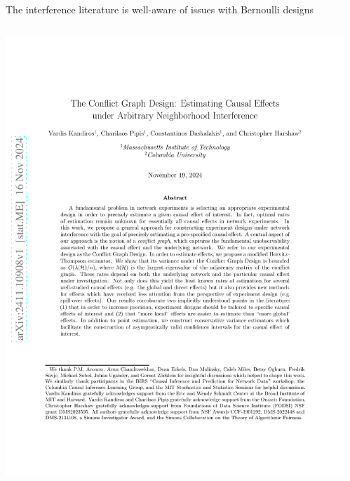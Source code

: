 \documentclass[aspectratio=169]{beamer}
\theoremstyle{remark}
\begin{document}
\begin{frame}{The interference literature is well-aware of issues with Bernoulli designs}
    \vfill
    \begin{columns}
        \begin{column}{0.5\textwidth}
            \centering
            \includegraphics[height=0.95\textheight, page=1, trim={2.5cm 8cm 0 2cm}, clip]{./papers/conflict.pdf}
        \end{column}
        \begin{column}{0.5\textwidth}
            \centering

\end{column}
\end{columns}
\end{frame}
\end{document}
